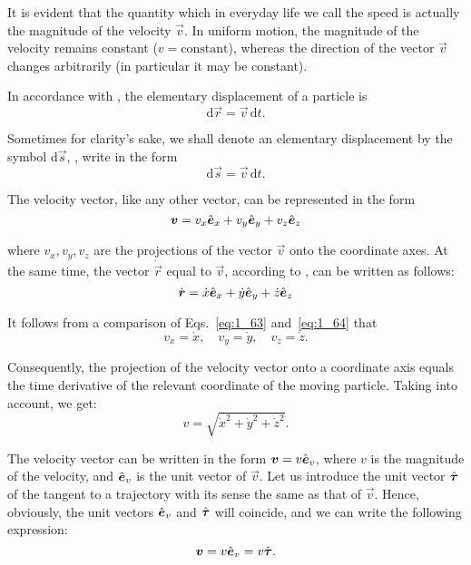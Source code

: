 It is evident that the quantity which in everyday life we call the speed is actually the magnitude of the velocity $\vec{v}$. In uniform motion, the magnitude of the velocity remains constant ($v=\text{constant}$), whereas the direction of the vector $\vec{v}$ changes arbitrarily (in particular it may be constant).

In accordance with , the elementary displacement of a particle is
\begin{equation}\label{eq:1_61}
\mathrm{d}\vec{r} = \vec{v}\,\mathrm{d}{t}. 
\end{equation}

\noindent
Sometimes for clarity's sake, we shall denote an elementary displacement by the symbol $\mathrm{d}\vec{s}$, \ie, write  in the form
\begin{equation}\label{eq:1_62}
\mathrm{d}\vec{s} = \vec{v}\,\mathrm{d}{t}. 
\end{equation}

The velocity vector, like any other vector, can be represented in the form
\begin{equation}\label{eq:1_63}
\boldsymbol{v} = v_x\hat{\boldsymbol{e}}_{x} + v_y\hat{\boldsymbol{e}}_{y} + v_z\hat{\boldsymbol{e}}_{z}
\end{equation}

\noindent
where $v_x, v_y, v_z$ are the projections of the vector $\vec{v}$ onto the coordinate axes. At the same time, the vector $\dot{\vec{r}}$ equal to $\vec{v}$, according to , can be written as follows:
\vspace{-12pt}
\begin{equation}\label{eq:1_64}
\dot{\boldsymbol{r}} = \dot{x}\hat{\boldsymbol{e}}_{x} + \dot{y}\hat{\boldsymbol{e}}_{y} + \dot{z}\hat{\boldsymbol{e}}_{z}
\end{equation}

\noindent
It follows from a comparison of Eqs.~\eqref{eq:1_63} and~\eqref{eq:1_64} that
\begin{equation}\label{eq:1_65}
v_x = \dot{x},\quad v_y = \dot{y},\quad v_z = \dot{z}.
\end{equation}

\noindent
Consequently, the projection of the velocity vector onto a coordinate axis equals the time derivative of the relevant coordinate of the moving particle. Taking  into account, we get:
\begin{equation}\label{eq:1_66}
v = \sqrt{\dot{x}^2 + \dot{y}^2 + \dot{z}^2}.
\end{equation}

The velocity vector can be written in the form $\boldsymbol{v}=v\hat{\boldsymbol{e}}_{v}$, where $v$ is the magnitude of the velocity, and $\hat{\boldsymbol{e}}_{v}$ is the unit vector of $\vec{v}$. Let us introduce the unit vector $\hat{\boldsymbol{\tau}}$ of the tangent to a trajectory with its sense the same as that of $\vec{v}$. Hence, obviously, the unit vectors $\hat{\boldsymbol{e}}_{v}$ and $\hat{\boldsymbol{\tau}}$ will coincide, and we can write the following expression:
\vspace{-12pt}
\begin{equation}\label{eq:1_67}
\boldsymbol{v} = v\hat{\boldsymbol{e}}_{v} = v\hat{\boldsymbol{\tau}}.
\end{equation}

